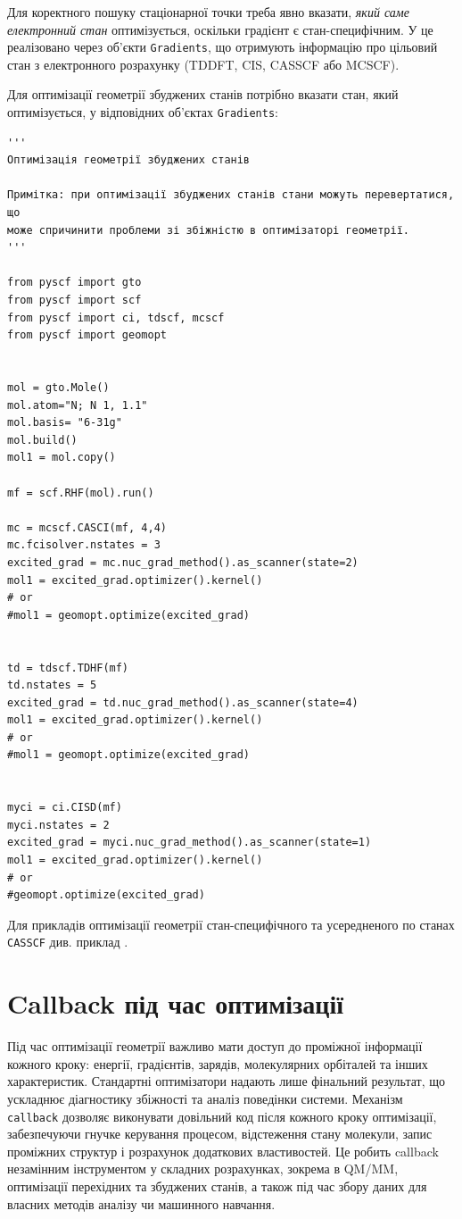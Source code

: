 Для коректного пошуку стаціонарної точки треба явно вказати,
\emph{який саме електронний стан} оптимізується, оскільки градієнт є
стан-специфічним. У \PySCF{} це реалізовано через об’єкти
\texttt{Gradients}, що отримують інформацію про цільовий стан з
електронного розрахунку (TDDFT, CIS, CASSCF або MCSCF).


Для оптимізації геометрії збуджених станів потрібно вказати стан, який оптимізується, у відповідних об'єктах \texttt{Gradients}:

\begin{verbatim}
'''
Оптимізація геометрії збуджених станів

Примітка: при оптимізації збуджених станів стани можуть перевертатися, що
може спричинити проблеми зі збіжністю в оптимізаторі геометрії.
'''

from pyscf import gto
from pyscf import scf
from pyscf import ci, tdscf, mcscf
from pyscf import geomopt


mol = gto.Mole()
mol.atom="N; N 1, 1.1"
mol.basis= "6-31g"
mol.build()
mol1 = mol.copy()

mf = scf.RHF(mol).run()

mc = mcscf.CASCI(mf, 4,4)
mc.fcisolver.nstates = 3
excited_grad = mc.nuc_grad_method().as_scanner(state=2)
mol1 = excited_grad.optimizer().kernel()
# or
#mol1 = geomopt.optimize(excited_grad)


td = tdscf.TDHF(mf)
td.nstates = 5
excited_grad = td.nuc_grad_method().as_scanner(state=4)
mol1 = excited_grad.optimizer().kernel()
# or
#mol1 = geomopt.optimize(excited_grad)


myci = ci.CISD(mf)
myci.nstates = 2
excited_grad = myci.nuc_grad_method().as_scanner(state=1)
mol1 = excited_grad.optimizer().kernel()
# or
#geomopt.optimize(excited_grad)
\end{verbatim}

Для прикладів оптимізації геометрії стан-специфічного та усередненого по станах \texttt{CASSCF} див. приклад .

\section{Callback під час оптимізації}

Під час оптимізації геометрії важливо мати доступ до проміжної інформації кожного кроку:
енергії, градієнтів, зарядів, молекулярних орбіталей та інших характеристик. Стандартні
оптимізатори надають лише фінальний результат, що ускладнює діагностику збіжності та
аналіз поведінки системи. Механізм \texttt{callback} дозволяє виконувати довільний код після
кожного кроку оптимізації, забезпечуючи гнучке керування процесом, відстеження стану
молекули, запис проміжних структур і розрахунок додаткових властивостей. Це робить
callback незамінним інструментом у складних розрахунках, зокрема в QM/MM, оптимізації
перехідних та збуджених станів, а також під час збору даних для власних методів аналізу чи
машинного навчання.

